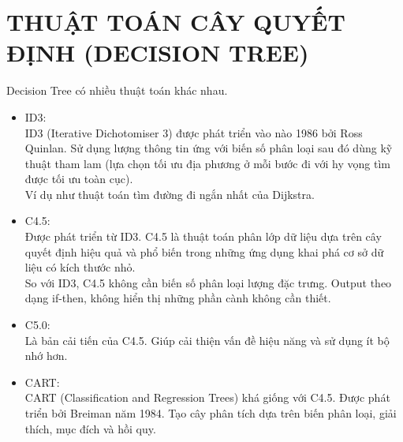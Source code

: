 \chapter{THUẬT TOÁN CÂY QUYẾT ĐỊNH (DECISION TREE)}

Decision Tree có nhiều thuật toán khác nhau.

\begin{itemize}
    \item ID3:\\
    ID3 (Iterative Dichotomiser 3) được phát triển vào nào 1986 bởi Ross Quinlan.
    Sử dụng lượng thông tin ứng với biến số phân loại sau đó dùng kỹ thuật tham lam
    (lựa chọn tối ưu địa phương ở mỗi bước đi với hy vọng tìm được tối ưu toàn cục).\\
    Ví dụ như thuật toán tìm đường đi ngắn nhất của Dijkstra.
    \item C4.5:\\
    Được phát triển từ ID3. C4.5 là thuật toán phân lớp dữ liệu dựa trên cây quyết định
    hiệu quả và phổ biến trong những ứng dụng khai phá cơ sở dữ liệu có kích thước nhỏ.\\
    So với ID3, C4.5 không cần biến số phân loại lượng đặc trưng.
    Output theo dạng if-then, không hiển thị những phần cành không cần thiết.
    \item C5.0:\\
    Là bản cải tiến của C4.5. Giúp cải thiện vấn đề hiệu năng và sử dụng ít bộ nhớ hơn.
    \item CART:\\
    CART (Classification and Regression Trees) khá giống với C4.5.
    Được phát triển bởi Breiman năm 1984. Tạo cây phân tích dựa trên biến phân loại,
    giải thích, mục đích và hồi quy.
\end{itemize}
